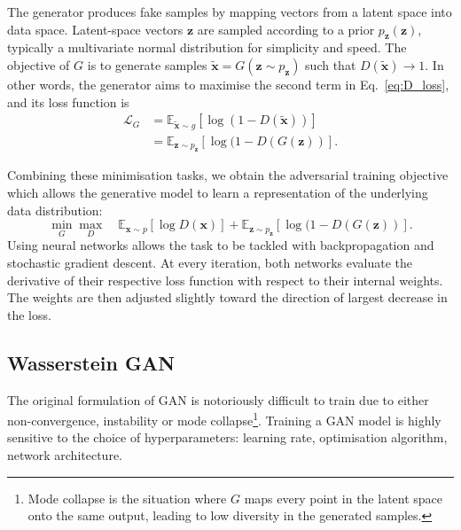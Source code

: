 The generator produces fake samples by mapping vectors from a latent space into data space. Latent-space vectors $\mathbf{z}$ are sampled according to a prior $p_\mathbf{z}(\mathbf{z})$, typically a multivariate normal distribution for simplicity and speed. The objective of $G$ is to generate samples $\tilde{\mathbf{x}} = G(\mathbf{z} \sim p_\mathbf{z})$ such that $D(\tilde{\mathbf{x}}) \rightarrow 1$. In other words, the generator aims to maximise the second term in Eq.~\ref{eq:D_loss}, and its loss function is
\begin{align*}
    \mathcal{L}_G &=     
    \mathbb{E}_{\tilde{\mathbf{x}} \sim g} [ \log( 1 - D(\tilde{\mathbf{x}}) )]\\
    &= \mathbb{E}_{\mathbf{z} \sim p_\mathbf{z}} [ \log( 1 - D(G(\mathbf{z}) )].
\end{align*}

Combining these minimisation tasks, we obtain the adversarial training objective which allows the generative model to learn a representation of the underlying data distribution:
\begin{equation}\label{eq:GAN}
    \min_G \max_D \quad
    \mathbb{E}_{\mathbf{x} \sim p} [ \log D(\mathbf{x}) ] +
    \mathbb{E}_{\mathbf{z} \sim p_\mathbf{z}} [ \log( 1 - D(G(\mathbf{z}) )].
\end{equation}
Using neural networks allows the task to be tackled with backpropagation and stochastic gradient descent. At every iteration, both networks evaluate the derivative of their respective loss function with respect to their internal weights. The weights are then adjusted slightly toward the direction of largest decrease in the loss.


\subsection{Wasserstein GAN}
The original formulation of GAN is notoriously difficult to train due to either non-convergence, instability or mode collapse\footnote{Mode collapse is the situation where $G$ maps every point in the latent space onto the same output, leading to low diversity in the generated samples.}. 
Training a GAN model is highly sensitive to the choice of hyperparameters: learning rate, optimisation algorithm, network architecture. 

